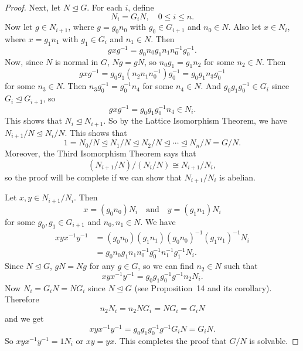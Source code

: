 \begin{proof}
  Next, let $N\trianglelefteq G$. For each $i$, define
  \begin{equation*}
    N_i = G_iN, \quad 0\leq i\leq n.
  \end{equation*}
  Now let $g\in N_{i+1}$, where $g = g_0n_0$ with $g_0\in G_{i+1}$ and
  $n_0\in N$. Also let $x\in N_i$, where $x = g_1n_1$ with
  $g_1\in G_i$ and $n_1\in N$. Then
  \begin{equation*}
    gxg^{-1} = g_0n_0g_1n_1n_0^{-1}g_0^{-1}.
  \end{equation*}
  Now, since $N$ is normal in $G$, $Ng = gN$, so $n_0g_1 = g_1n_2$
  for some $n_2\in N$. Then
  \begin{equation*}
    gxg^{-1} = g_0g_1(n_2n_1n_0^{-1})g_0^{-1}
    = g_0g_1n_3g_0^{-1}
  \end{equation*}
  for some $n_3\in N$. Then $n_3g_0^{-1} = g_0^{-1}n_4$ for some
  $n_4\in N$. And $g_0g_1g_0^{-1}\in G_i$ since
  $G_i\trianglelefteq G_{i+1}$, so
  \begin{equation*}
    gxg^{-1} = g_0g_1g_0^{-1}n_4 \in N_i.
  \end{equation*}
  This shows that $N_i\trianglelefteq N_{i+1}$. So by the Lattice
  Isomorphism Theorem, we have $N_{i+1}/N \trianglelefteq N_i/N$. This
  shows that
  \begin{equation*}
    1 = N_0/N \trianglelefteq N_1/N \trianglelefteq N_2/N
    \trianglelefteq \cdots \trianglelefteq
    N_n/N = G/N.
  \end{equation*}
  Moreover, the Third Isomorphism Theorem says that
  \begin{equation*}
    (N_{i+1}/N)/(N_i/N) \cong N_{i+1}/N_i,
  \end{equation*}
  so the proof will be complete if we can show that $N_{i+1}/N_i$ is
  abelian.

  Let $x,y\in N_{i+1}/N_i$. Then
  \begin{equation*}
    x = (g_0n_0)N_i \quad\text{and}\quad
    y = (g_1n_1)N_i
  \end{equation*}
  for some $g_0,g_1\in G_{i+1}$ and $n_0,n_1\in N$. We have
  \begin{align*}
    xyx^{-1}y^{-1}
    &= (g_0n_0)(g_1n_1)(g_0n_0)^{-1}(g_1n_1)^{-1}N_i \\
    &= g_0n_0g_1n_1n_0^{-1}g_0^{-1}n_1^{-1}g_1^{-1}N_i.
  \end{align*}
  Since $N\trianglelefteq G$, $gN = Ng$ for any $g\in G$, so we can
  find $n_2\in N$ such that
  \begin{equation*}
    xyx^{-1}y^{-1}
    = g_0g_1g_0^{-1}g^{-1}n_2N_i.
  \end{equation*}
  Now $N_i = G_iN = NG_i$ since $N\trianglelefteq G$ (see
  Proposition~14 and its corollary). Therefore
  \begin{equation*}
    n_2N_i = n_2NG_i = NG_i = G_iN
  \end{equation*}
  and we get
  \begin{equation*}
    xyx^{-1}y^{-1}
    = g_0g_1g_0^{-1}g^{-1}G_iN
    = G_iN.
  \end{equation*}
  So $xyx^{-1}y^{-1} = 1N_i$ or $xy = yx$. This completes the proof
  that $G/N$ is solvable.
\end{proof}

